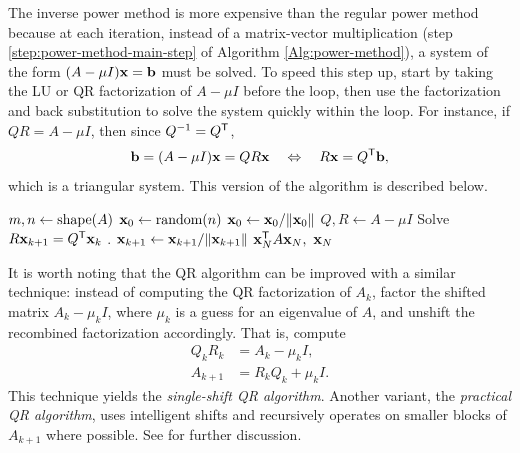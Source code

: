 The inverse power method is more expensive than the regular power method because at each iteration, instead of a matrix-vector multiplication (step \ref{step:power-method-main-step} of Algorithm \ref{Alg:power-method}), a system of the form $(A - \mu I)\mathbf{x} = \mathbf{b}$ must be solved.
To speed this step up, start by taking the LU or QR factorization of $A - \mu I$ before the loop, then use the factorization and back substitution to solve the system quickly within the loop.
For instance, if $QR = A - \mu I$, then since $Q^{-1} = Q^{\mathsf T}$,
\begin{align*}
    \mathbf{b}
    = (A-\mu I)\mathbf{x}
    = QR\mathbf{x}
    \quad\Leftrightarrow\quad
    R\mathbf{x} = Q^{\mathsf T}\mathbf{b},
\end{align*}
which is a triangular system.
This version of the algorithm is described below.

\begin{algorithm}[H] %
\begin{algorithmic}[1]
    \State $m, n \gets \mathrm{shape}(A)$
    \State $\mathbf{x}_0 \gets \text{random}(n)$
    \State $\mathbf{x}_0 \gets \mathbf{x}_0/\|\mathbf{x}_0\|$
    \State $Q,R \gets A-\mu I$
        \State Solve $R\mathbf{x}_{k+1} = Q^{\mathsf T}\mathbf{x}_{k}$
            .
        \State $\mathbf{x}_{k+1} \gets \mathbf{x}_{k+1}/\|\mathbf{x}_{k+1}\|$
    \EndFor
    \State {} $\mathbf{x}_N^{\mathsf T} A \mathbf{x}_N,\ \mathbf{x}_N$
\EndProcedure
\end{algorithmic}
\caption{}
\label{Alg:inverse-power-method}
\end{algorithm}

It is worth noting that the QR algorithm can be improved with a similar technique: instead of computing the QR factorization of $A_k$, factor the shifted matrix $A_{k} - \mu_k I$, where $\mu_k$ is a guess for an eigenvalue of $A$, and unshift the recombined factorization accordingly.
That is, compute
\begin{align*}
    Q_k R_k &= A_k - \mu_k I,\\
    A_{k+1} &= R_k Q_k + \mu_k I.
\end{align*}
This technique yields the \emph{single-shift QR algorithm}.
Another variant, the \emph{practical QR algorithm}, uses intelligent shifts and recursively operates on smaller blocks of $A_{k+1}$ where possible.
See \cite{quarteroni2010numerical,Trefethen1997} for further discussion.

